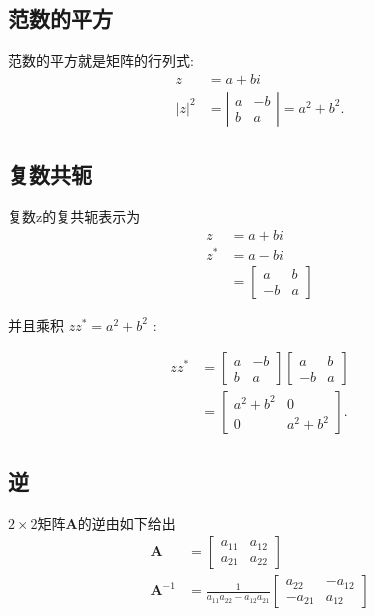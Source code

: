 \subsection{范数的平方}
范数的平方就是矩阵的行列式:
$$
\begin{aligned}
z & =a+b i \\
|z|^{2} & =\left|\begin{array}{cc}
a & -b \\
b & a
\end{array}\right|=a^{2}+b^{2} .
\end{aligned}
$$

\subsection{复数共轭}
复数z的复共轭表示为
$$
\begin{aligned}
z & =a+b i \\
z^{*} & =a-b i \\
& =\left[\begin{array}{cc}
a & b \\
-b & a
\end{array}\right]
\end{aligned}
$$

并且乘积 $z z^{*}=a^{2}+b^{2}$ :

$$
\begin{aligned}
z z^{*} & =\left[\begin{array}{cc}
a & -b \\
b & a
\end{array}\right]\left[\begin{array}{cc}
a & b \\
-b & a
\end{array}\right] \\
& =\left[\begin{array}{cc}
a^{2}+b^{2} & 0 \\
0 & a^{2}+b^{2}
\end{array}\right] .
\end{aligned}
$$

\subsection{逆}
$2 \times 2$矩阵$\mathbf{A}$的逆由如下给出
$$
\begin{aligned}
\mathbf{A} & =\left[\begin{array}{ll}
a_{11} & a_{12} \\
a_{21} & a_{22}
\end{array}\right] \\
\mathbf{A}^{-1} & =\frac{1}{a_{11} a_{22}-a_{12} a_{21}}\left[\begin{array}{cc}
a_{22} & -a_{12} \\
-a_{21} & a_{12}
\end{array}\right]
\end{aligned}
$$

